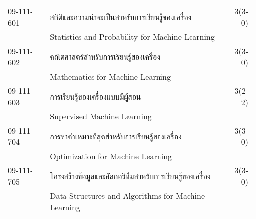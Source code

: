 \begin{longtable}{p{}p{}r{}}
09-111-601 & สถิติและความน่าจะเป็นสำหรับการเรียนรู้ของเครื่อง & 3(3-0)\\
& Statistics and Probability for Machine Learning & \\[3mm]
09-111-602 & คณิตศาสตร์สำหรับการเรียนรู้ของเครื่อง & 3(3-0)\\
& Mathematics for Machine Learning & \\[3mm]
09-111-603 & การเรียนรู้ของเครื่องแบบมีผู้สอน & 3(2-2)\\
& Supervised Machine Learning & \\[3mm]
09-111-704 & การหาค่าเหมาะที่สุดสำหรับการเรียนรู้ของเครื่อง & 3(3-0)\\
& Optimization for Machine Learning & \\[3mm]
09-111-705 & โครงสร้างข้อมูลและอัลกอริทึมสำหรับการเรียนรู้ของเครื่อง & 3(3-0)\\
& Data Structures and Algorithms for Machine Learning & \\[3mm]
\end{longtable}
